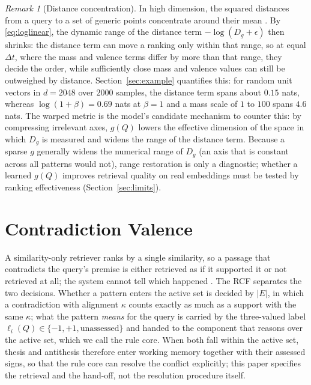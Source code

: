 \documentclass[11pt]{article}
\theoremstyle{remark}
\newtheorem{remark}{Remark}
\newcommand{\act}{E}
\newcommand{\dist}{D_g}
\begin{document}
\begin{remark}[Distance concentration]
\label{rem:concentration}
In high dimension, the squared distances from a query to a set of generic points concentrate around their mean \citep{beyer1999nearest,aggarwal2001surprising}. By \eqref{eq:loglinear}, the dynamic range of the distance term $-\log(\dist+\epsilon)$ then shrinks: the distance term can move a ranking only within that range, so at equal $\Delta t$, where the mass and valence terms differ by more than that range, they decide the order, while sufficiently close mass and valence values can still be outweighed by distance. Section~\ref{sec:example} quantifies this: for random unit vectors in $d=2048$ over $2000$ samples, the distance term spans about $0.15$ nats, whereas $\log(1+\beta)=0.69$ nats at $\beta=1$ and a mass scale of $1$ to $100$ spans $4.6$ nats. The warped metric is the model's candidate mechanism to counter this: by compressing irrelevant axes, $g(Q)$ lowers the effective dimension of the space in which $\dist$ is measured and widens the range of the distance term. Because a sparse $g$ generally widens the numerical range of $\dist$ (an axis that is constant across all patterns would not), range restoration is only a diagnostic; whether a learned $g(Q)$ improves retrieval quality on real embeddings must be tested by ranking effectiveness (Section~\ref{sec:limits}).
\end{remark}

\section{Contradiction Valence}
\label{sec:valence}

A similarity-only retriever ranks by a single similarity, so a passage that contradicts the query's premise is either retrieved as if it supported it or not retrieved at all; the system cannot tell which happened \citep{weller2024nevir}. The RCF separates the two decisions. Whether a pattern enters the active set is decided by $|\act|$, in which a contradiction with alignment $\kappa$ counts exactly as much as a support with the same $\kappa$; what the pattern \emph{means} for the query is carried by the three-valued label $\ell_i(Q)\in\{-1,+1,\text{unassessed}\}$ and handed to the component that reasons over the active set, which we call the rule core. When both fall within the active set, thesis and antithesis therefore enter working memory together with their assessed signs, so that the rule core can resolve the conflict explicitly; this paper specifies the retrieval and the hand-off, not the resolution procedure itself.
\end{document}
